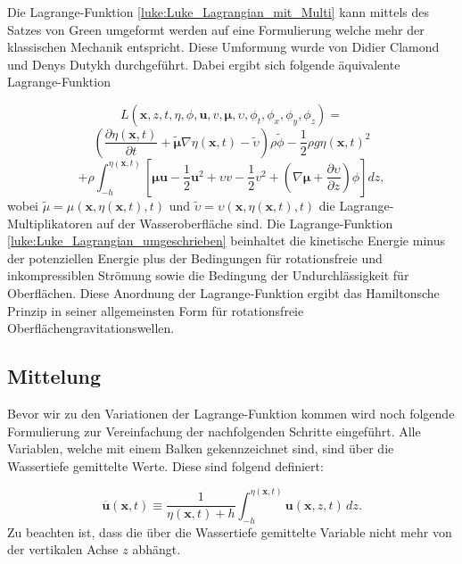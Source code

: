 Die Lagrange-Funktion \eqref{luke:Luke_Lagrangian_mit_Multi} kann mittels des Satzes von Green umgeformt werden auf eine Formulierung welche mehr der klassischen Mechanik entspricht.
Diese Umformung wurde von Didier Clamond und Denys Dutykh \cite{luke:CLAMOND201225} durchgeführt. Dabei ergibt sich folgende äquivalente Lagrange-Funktion

\[
L(\bm{x},z,t,\eta,\phi,\bm{u}, v, \bm{\mu},\upsilon,\phi_t,\phi_x,\phi_y,\phi_z)
=
\]
\[
\left(\frac{\partial \eta(\bm{x},t)}{\partial t}
+
\tilde{\bm{\mu}} \nabla \eta(\bm{x},t)
-
\tilde{\upsilon}\right) \rho\tilde{\phi}
-
\frac{1}{2} \rho g \eta(\bm{x},t)^2
\]
\begin{equation}
	+
	\rho
	\int_{-h}^{\eta(\bm{x},t)} \left[ \bm{\mu}  \bm{u} - \frac{1}{2} \bm{u}^2 + \upsilon v - \frac{1}{2} v^2 + \left(\nabla \bm{\mu} + \frac{\partial \upsilon}{\partial z}\right) \phi \right] dz,
	\label{luke:Luke_Lagrangian_umgeschrieben}
\end{equation}
wobei $\tilde{\mu} = \mu(\bm{x},\eta(\bm{x},t),t)$ und $\tilde{\upsilon} = \upsilon(\bm{x},\eta(\bm{x},t),t)$ die Lagrange-Multiplikatoren auf der Wasseroberfläche sind.
Die Lagrange-Funktion \eqref{luke:Luke_Lagrangian_umgeschrieben} beinhaltet die kinetische Energie minus der potenziellen Energie plus der Bedingungen für rotationsfreie und inkompressiblen Strömung sowie die Bedingung der Undurchlässigkeit für Oberflächen.
Diese Anordnung der Lagrange-Funktion ergibt das Hamiltonsche Prinzip in seiner allgemeinsten Form für rotationsfreie Oberflächengravitationswellen.

\subsection{Mittelung}
Bevor wir zu den Variationen der Lagrange-Funktion kommen wird noch folgende Formulierung zur Vereinfachung der nachfolgenden Schritte eingeführt.
Alle Variablen, welche mit einem Balken gekennzeichnet sind, sind über die Wassertiefe gemittelte Werte. Diese sind folgend definiert:

\begin{equation}
	\overline{\bm{u}}(\bm{x}, t) \equiv \frac{1}{\eta(\bm{x}, t) + h} \int_{-h}^{\eta(\bm{x},t)} \bm{u}(\bm{x},z,t) \, dz.
	\label{luke:Mittelung_Wassertiefe}
\end{equation}
Zu beachten ist, dass die über die Wassertiefe gemittelte Variable nicht mehr von der vertikalen Achse $z$ abhängt.

